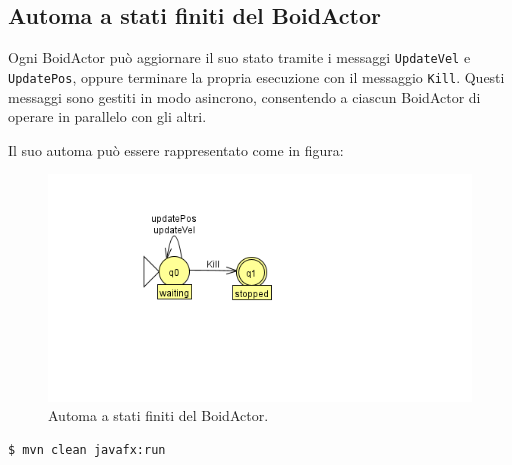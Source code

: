 \documentclass[a4paper,12pt]{report}
\begin{document}
        \subsection*{Automa a stati finiti del BoidActor}
            Ogni BoidActor può aggiornare il suo stato tramite i messaggi \texttt{UpdateVel} e \texttt{UpdatePos}, oppure terminare la propria esecuzione con il messaggio \texttt{Kill}. Questi messaggi sono gestiti in modo asincrono, consentendo a ciascun BoidActor di operare in parallelo con gli altri.

            Il suo automa può essere rappresentato come in figura:
            \begin{figure}[ht!]
                \centering
                \includegraphics[width=\textwidth]{img/FSM/BoidActor.png}
                \caption{Automa a stati finiti del BoidActor.}
                \label{fig:Boid_actor_fsm}
            \end{figure}

        \begin{lstlisting}[style=bash, caption={Avvio dello script}]
            $ mvn clean javafx:run
        \end{lstlisting}
    
    
\end{document}
